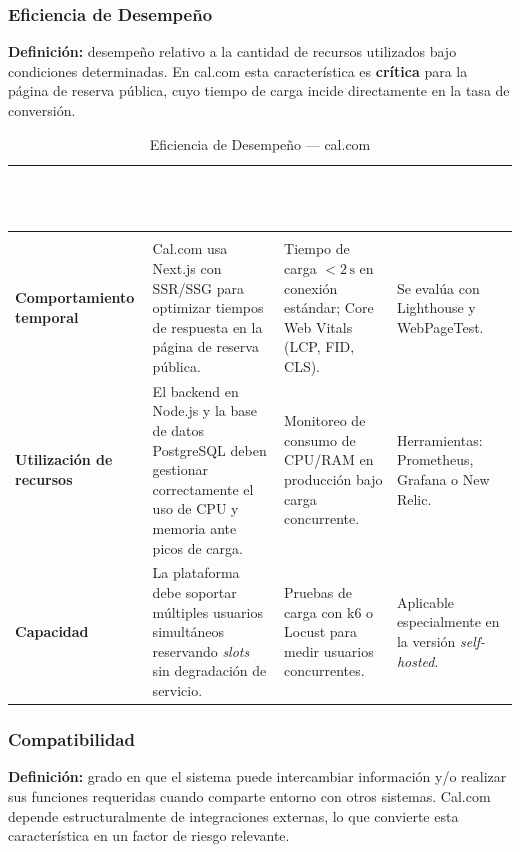 \documentclass[12pt, a4paper]{article}
\newcommand{\rowpair}{\rowcolor{grisMedio}}
\newcommand{\rowimpar}{\rowcolor{grisClaro}}
\begin{document}
\subsubsection{Eficiencia de Desempeño}

\textbf{Definición:} desempeño relativo a la cantidad de recursos utilizados bajo
condiciones determinadas. En cal.com esta característica es \textbf{crítica} para la
página de reserva pública, cuyo tiempo de carga incide directamente en la tasa de
conversión.

\begin{longtable}{>{\bfseries}p{3cm} p{4.5cm} p{4cm} p{3.5cm}}
\caption{Eficiencia de Desempeño — cal.com} \label{tab:desempeno} \\
\rowcolor{azulClaro}
\textcolor{white}{\textbf{Subcaracterística}} &
\textcolor{white}{\textbf{Descripción aplicada a cal.com}} &
\textcolor{white}{\textbf{Criterio de evaluación}} &
\textcolor{white}{\textbf{Observaciones}} \\
\endfirsthead
\multicolumn{4}{c}{\tablename\ \thetable{} -- continuación} \\
\endhead
\rowpair
Comportamiento temporal &
Cal.com usa Next.js con SSR/SSG para optimizar tiempos de respuesta en la página de
reserva pública. &
Tiempo de carga $< 2\,\text{s}$ en conexión estándar; Core Web Vitals (LCP, FID, CLS). &
Se evalúa con Lighthouse y WebPageTest. \\
\rowimpar
Utilización de recursos &
El backend en Node.js y la base de datos PostgreSQL deben gestionar correctamente el
uso de CPU y memoria ante picos de carga. &
Monitoreo de consumo de CPU/RAM en producción bajo carga concurrente. &
Herramientas: Prometheus, Grafana o New Relic. \\
\rowpair
Capacidad &
La plataforma debe soportar múltiples usuarios simultáneos reservando \textit{slots} sin
degradación de servicio. &
Pruebas de carga con k6 o Locust para medir usuarios concurrentes. &
Aplicable especialmente en la versión \textit{self-hosted}. \\
\end{longtable}

\subsubsection{Compatibilidad}

\textbf{Definición:} grado en que el sistema puede intercambiar información y/o realizar
sus funciones requeridas cuando comparte entorno con otros sistemas. Cal.com depende
estructuralmente de integraciones externas, lo que convierte esta característica en un
factor de riesgo relevante.
\end{document}
